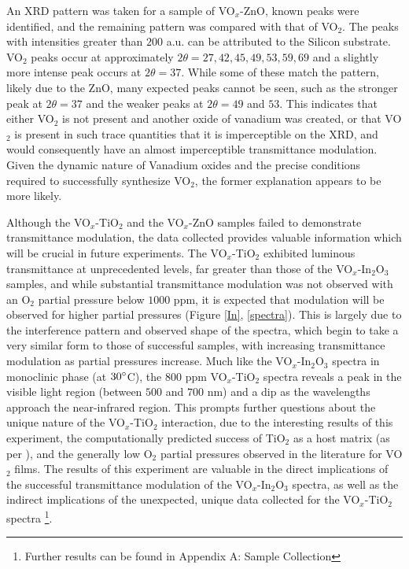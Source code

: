 \documentclass[a4paper]{article}
\begin{document}

An XRD pattern was taken for a sample of VO$_x$-ZnO, known peaks were identified, and the remaining pattern was compared with that of VO$_2$. The peaks with intensities greater than $200$ a.u. can be attributed to the Silicon substrate. VO$_2$ peaks occur at approximately $2\theta = 27, 42, 45, 49, 53, 59, 69$ and a slightly more intense peak occurs at $2\theta = 37$. While some of these match the pattern, likely due to the ZnO, many expected peaks cannot be seen, such as the stronger peak at $2\theta = 37$ and the weaker peaks at $2\theta = 49$ and $53$. This indicates that either VO$_2$ is not present and another oxide of vanadium was created, or that VO$_2$ is present in such trace quantities that it is imperceptible on the XRD, and would consequently have an almost imperceptible transmittance modulation. Given the dynamic nature of Vanadium oxides and the precise conditions required to successfully synthesize VO$_2$, the former explanation appears to be more likely.


Although the VO$_x$-TiO$_2$ and the VO$_x$-ZnO samples failed to demonstrate transmittance modulation, the data collected provides valuable information which will be crucial in future experiments.  The VO$_x$-TiO$_2$ exhibited luminous transmittance at unprecedented levels, far greater than those of the VO$_x$-In$_2$O$_3$ samples, and while substantial transmittance modulation was not observed with an O$_2$ partial pressure below $1000$ ppm, it is expected that modulation will be observed for higher partial pressures (Figure \ref{In}, \ref{spectra}). This is largely due to the interference pattern and observed shape of the spectra, which begin to take a very similar form to those of successful samples, with increasing transmittance modulation as partial pressures increase. Much like the VO$_x$-In$_2$O$_3$ spectra in monoclinic phase (at $30\degree$C), the 800 ppm VO$_x$-TiO$_2$ spectra reveals a peak in the visible light region (between $500$ and $700$ nm) and a dip as the wavelengths approach the near-infrared region. This prompts further questions about the unique nature of the VO$_x$-TiO$_2$ interaction, due to the interesting results of this experiment, the computationally predicted success of TiO$_2$ as a host matrix (as per \cite{li}), and the generally low O$_2$ partial pressures observed in the literature for VO$_2$ films. The results of this experiment are valuable in the direct implications of the successful transmittance modulation of the VO$_x$-In$_2$O$_3$ spectra, as well as the indirect implications of the unexpected, unique data collected for the VO$_x$-TiO$_2$ spectra \footnote{Further results can be found in Appendix A: Sample Collection}.
    
\end{document}
